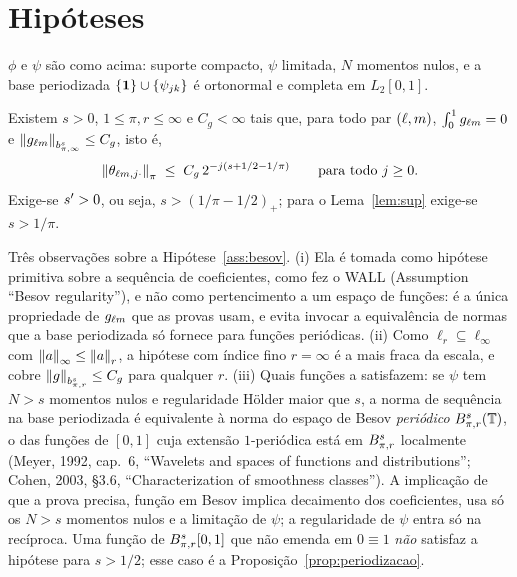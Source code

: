 \documentclass[11pt,a4paper]{article}
\begin{document}
\section{Hipóteses}

\begin{assumption}[base]\label{ass:base}
$\phi$ e $\psi$ são como acima: suporte compacto, $\psi$ limitada, $N$
momentos nulos, e a base periodizada $\{\mathbf{1}\}\cup\{\psi_{jk}\}$
é ortonormal e completa em $L_{2}[0,1]$.
\end{assumption}

\begin{assumption}\label{ass:besov}
Existem $s > 0$, $1 \le \pi, r \le \infty$ e $C_{g} < \infty$ tais que, para
todo par $(\ell, m)$, $\int_{0}^{1}g_{\ell m} = 0$ e
$\left\lVert g_{\ell m} \right\rVert_{b^{s}_{\pi,\infty}} \le C_{g}$, isto é,
\[
  \left\lVert \theta_{\ell m,j\cdot} \right\rVert_{\pi} \;\le\; C_{g}\,
  2^{-j(s + 1/2 - 1/\pi)} \qquad \text{para todo } j \ge 0 .
\]
Exige-se $s' > 0$, ou seja, $s > (1/\pi - 1/2)_{+}$; para o Lema~\ref{lem:sup}
exige-se $s > 1/\pi$.
\end{assumption}

Três observações sobre a Hipótese~\ref{ass:besov}. (i) Ela é tomada como
hipótese primitiva sobre a sequência de coeficientes, como fez o WALL
(Assumption ``Besov regularity''), e não como pertencimento a um espaço de
funções: é a única propriedade de $g_{\ell m}$ que as provas usam, e
evita invocar a equivalência de normas que a base periodizada só fornece
para funções periódicas. (ii) Como $\ell_{r} \subseteq \ell_{\infty}$ com
$\left\lVert a \right\rVert_{\infty} \le \left\lVert a \right\rVert_{r}$, a hipótese com índice fino $r = \infty$
é a mais fraca da escala, e cobre $\left\lVert g \right\rVert_{b^{s}_{\pi,r}} \le C_{g}$ para
qualquer $r$. (iii) Quais funções a satisfazem: se $\psi$ tem $N > s$
momentos nulos e regularidade Hölder maior que $s$, a norma de sequência na
base periodizada é equivalente à norma do espaço de Besov \emph{periódico}
$B^{s}_{\pi,r}(\mathbb{T})$, o das funções de $[0,1]$ cuja extensão
$1$-periódica está em $B^{s}_{\pi,r}$ localmente (Meyer, 1992, cap.~6, ``Wavelets and spaces of
functions and distributions''; Cohen, 2003, \S 3.6, ``Characterization of
smoothness classes''). A implicação de que a prova
precisa, função em Besov implica decaimento dos coeficientes, usa só os $N > s$
momentos nulos e a limitação de $\psi$; a regularidade de $\psi$ entra só na
recíproca. Uma função de $B^{s}_{\pi,r}[0,1]$ que não emenda em $0 \equiv 1$
\emph{não} satisfaz a hipótese para $s > 1/2$; esse caso é a
Proposição~\ref{prop:periodizacao}.
\end{document}
